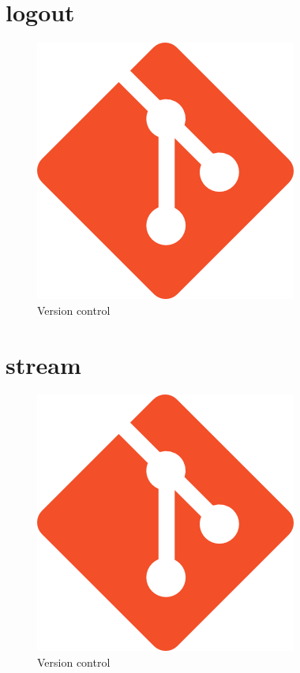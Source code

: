 \documentclass{article}
\begin{document}
\section{logout}
\begin{figure}[ht]
    \centering
    \includegraphics[width=.5\linewidth]{git_logo}
    \caption{Version control}
    \label{fig:sub1}
    \end{figure}

\cleardoublepage























\section{stream}

\begin{figure}[ht]
    \centering
    \includegraphics[width=.5\linewidth]{git_logo}
    \caption{Version control}
    \label{fig:sub1}
    \end{figure}
\end{document}
